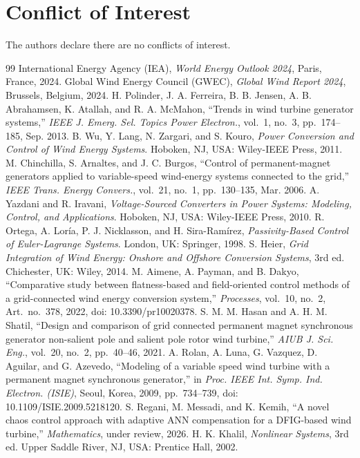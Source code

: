 \documentclass[conference]{IEEEtran}
\begin{document}
\section*{Conflict of Interest}
The authors declare there are no conflicts of interest.

\begin{thebibliography}{99}
 International Energy Agency (IEA), \emph{World Energy Outlook 2024}, Paris, France, 2024.
 Global Wind Energy Council (GWEC), \emph{Global Wind Report 2024}, Brussels, Belgium, 2024.
 H. Polinder, J. A. Ferreira, B. B. Jensen, A. B. Abrahamsen, K. Atallah, and
R. A. McMahon, ``Trends in wind turbine generator systems,'' \emph{IEEE J. Emerg. Sel. Topics Power
Electron.}, vol.~1, no.~3, pp.~174--185, Sep. 2013.
 B. Wu, Y. Lang, N. Zargari, and S. Kouro, \emph{Power Conversion and Control of Wind
Energy Systems}. Hoboken, NJ, USA: Wiley-IEEE Press, 2011.
 M. Chinchilla, S. Arnaltes, and J. C. Burgos, ``Control of permanent-magnet
generators applied to variable-speed wind-energy systems connected to the grid,'' \emph{IEEE Trans.
Energy Convers.}, vol.~21, no.~1, pp.~130--135, Mar. 2006.
 A. Yazdani and R. Iravani, \emph{Voltage-Sourced Converters in Power Systems:
Modeling, Control, and Applications}. Hoboken, NJ, USA: Wiley-IEEE Press, 2010.
 R. Ortega, A. Lor\'ia, P. J. Nicklasson, and H. Sira-Ram\'irez,
\emph{Passivity-Based Control of Euler-Lagrange Systems}. London, UK: Springer, 1998.
 S. Heier, \emph{Grid Integration of Wind Energy: Onshore and Offshore Conversion
Systems}, 3rd ed. Chichester, UK: Wiley, 2014.
 M. Aimene, A. Payman, and B. Dakyo, ``Comparative study between flatness-based and
field-oriented control methods of a grid-connected wind energy conversion system,'' \emph{Processes},
vol.~10, no.~2, Art.~no.~378, 2022, doi: 10.3390/pr10020378.
 S. M. M. Hasan and A. H. M. Shatil, ``Design and comparison of grid connected
permanent magnet synchronous generator non-salient pole and salient pole rotor wind turbine,''
\emph{AIUB J. Sci. Eng.}, vol.~20, no.~2, pp.~40--46, 2021.
 A. Rolan, A. Luna, G. Vazquez, D. Aguilar, and G. Azevedo, ``Modeling of a variable
speed wind turbine with a permanent magnet synchronous generator,'' in \emph{Proc. IEEE Int. Symp. Ind.
Electron. (ISIE)}, Seoul, Korea, 2009, pp.~734--739, doi: 10.1109/ISIE.2009.5218120.
 S. Regani, M. Messadi, and K. Kemih, ``A novel chaos control approach with
adaptive ANN compensation for a DFIG-based wind turbine,'' \emph{Mathematics}, under review, 2026.
 H. K. Khalil, \emph{Nonlinear Systems}, 3rd ed. Upper Saddle River, NJ, USA:
Prentice Hall, 2002.
\end{thebibliography}
\end{document}
